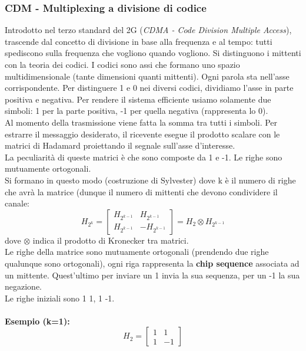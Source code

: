 \documentclass[10pt,a4paper,twoside]{article}
\begin{document}
\subsubsection{CDM - Multiplexing a divisione di codice}
Introdotto nel terzo standard del 2G (\textit{CDMA - Code Division Multiple Access}), trascende dal concetto di divisione in base alla frequenza e al tempo: tutti spediscono sulla frequenza che vogliono quando vogliono. Si distinguono i mittenti con la teoria dei codici. I codici sono assi che formano uno spazio multidimensionale (tante dimensioni quanti mittenti). Ogni parola sta nell'asse corrispondente. Per distinguere 1 e 0 nei diversi codici, dividiamo l'asse in parte positiva e negativa. Per rendere il sistema efficiente usiamo solamente due simboli: 1 per la parte positiva, -1 per quella negativa (rappresenta lo 0).\\
Al momento della trasmissione viene fatta la somma tra tutti i simboli. Per estrarre il messaggio desiderato, il ricevente esegue il prodotto scalare con le matrici di Hadamard proiettando il segnale sull'asse d'interesse.\\
La peculiarità di queste matrici è che sono composte da 1 e -1. Le righe sono mutuamente ortogonali.\\
Si formano in questo modo (costruzione di Sylvester) dove k è il numero di righe che avrà la matrice (dunque il numero di mittenti che devono condividere il canale:
\begin{equation}
H_{2^k}=
\begin{bmatrix}
H_{2^{k-1}} & H_{2^{k-1}}\\
H_{2^{k-1}} & -H_{2^{k-1}}
\end{bmatrix}
=H_2 \otimes H_{2^{k-1}}
\end{equation}
dove $\otimes$ indica il prodotto di Kronecker tra matrici.\\
Le righe della matrice sono mutuamente ortogonali (prendendo due righe qualunque sono ortogonali), ogni riga rappresenta la \textbf{chip sequence} associata ad un mittente. Quest'ultimo per inviare un 1 invia la sua sequenza, per un -1 la sua negazione.\\
Le righe iniziali sono 1 1, 1 -1.\\\\
\textbf{Esempio (k=1):}
\begin{equation}
H_2=
\begin{bmatrix}
1 & 1 \\
1 & -1
\end{bmatrix}
\end{equation}
\end{document}

